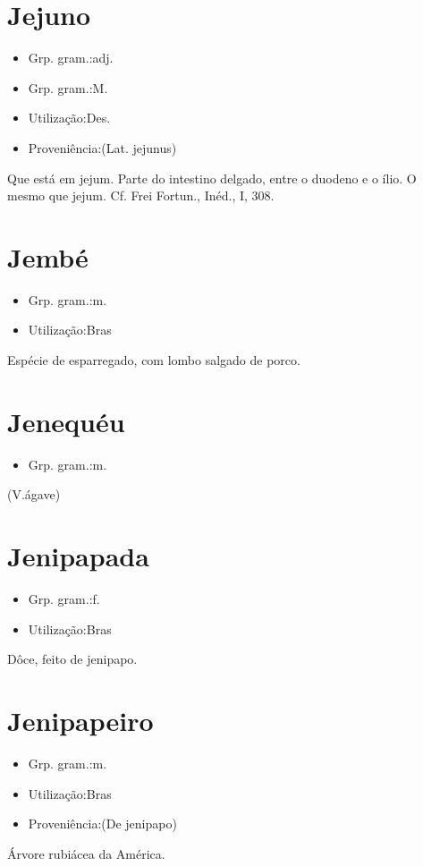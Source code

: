 \documentclass{article}
\begin{document}
\section{Jejuno}
\begin{itemize}
\item {Grp. gram.:adj.}
\end{itemize}
\begin{itemize}
\item {Grp. gram.:M.}
\end{itemize}
\begin{itemize}
\item {Utilização:Des.}
\end{itemize}
\begin{itemize}
\item {Proveniência:(Lat. \textunderscore jejunus\textunderscore )}
\end{itemize}
Que está em jejum.
Parte do intestino delgado, entre o duodeno e o ílio.
O mesmo que \textunderscore jejum\textunderscore . Cf. Frei Fortun., \textunderscore Inéd.\textunderscore , I, 308.
\section{Jembé}
\begin{itemize}
\item {Grp. gram.:m.}
\end{itemize}
\begin{itemize}
\item {Utilização:Bras}
\end{itemize}
Espécie de esparregado, com lombo salgado de porco.
\section{Jenequéu}
\begin{itemize}
\item {Grp. gram.:m.}
\end{itemize}
(V.ágave)
\section{Jenipapada}
\begin{itemize}
\item {Grp. gram.:f.}
\end{itemize}
\begin{itemize}
\item {Utilização:Bras}
\end{itemize}
Dôce, feito de jenipapo.
\section{Jenipapeiro}
\begin{itemize}
\item {Grp. gram.:m.}
\end{itemize}
\begin{itemize}
\item {Utilização:Bras}
\end{itemize}
\begin{itemize}
\item {Proveniência:(De \textunderscore jenipapo\textunderscore )}
\end{itemize}
Árvore rubiácea da América.
\end{document}
